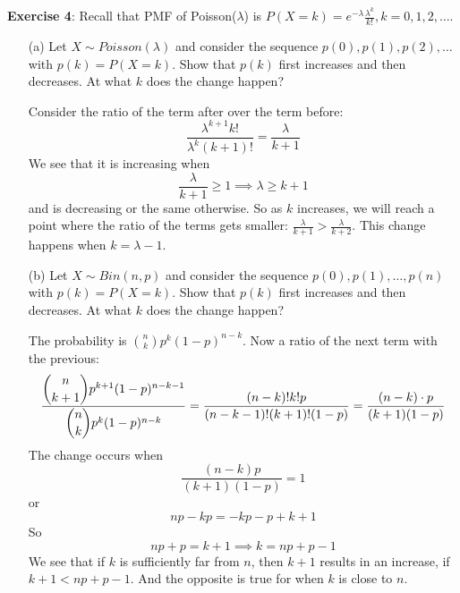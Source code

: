 \documentclass{article}
\begin{document}
\textbf{Exercise 4}: Recall that PMF of Poisson($\lambda$) is $P(X = k) = e^{-\lambda} \frac{\lambda^{k}}{k!}, k = 0, 1, 2, \ldots$.
    \begin{itemize}
        \item [(a)] Let $X \sim Poisson(\lambda)$ and consider the sequence $p(0), p(1), p(2), \ldots$ with $p(k) = P(X = k)$. Show that $p(k)$ first increases and then decreases. At what $k$ does the change happen?
            \begin{answer}
                Consider the ratio of the term after over the term before:
                    \begin{equation*}
                        \dfrac{\lambda^{k + 1}k!}{\lambda^{k}(k + 1)!} = \dfrac{\lambda}{k + 1}
                    \end{equation*}
                We see that it is increasing when 
                    \begin{equation*}
                        \dfrac{\lambda}{k + 1} \geq 1 \implies \lambda \geq k + 1
                    \end{equation*}
                and is decreasing or the same otherwise. So as $k$ increases, we will reach a point where the ratio of the terms gets smaller: $\frac{\lambda}{k + 1} > \frac{\lambda}{k + 2}$. This change happens when $k = \lambda - 1$.
            \end{answer}

        \item [(b)] Let $X \sim Bin(n, p)$ and consider the sequence $p(0), p(1), \ldots, p(n)$ with $p(k) = P(X = k)$. Show that $p(k)$ first increases and then decreases. At what $k$ does the change happen?
            \begin{answer}
                The probability is $\binom{n}{k}p^{k}(1 - p)^{n - k}$. Now a ratio of the next term with the previous:
                    \begin{equation*}
                        \dfrac{\dbinom{n}{k + 1} p^{k + 1}(1 - p)^{n - k - 1}}{\dbinom{n}{k}p^{k}(1 - p)^{n - k}} = \dfrac{(n - k)!k!p}{(n - k - 1)!(k + 1)!(1 - p)} = \dfrac{(n - k) \cdot p}{(k + 1)(1 - p)}
                    \end{equation*}
                The change occurs when
                    \begin{equation*}
                        \dfrac{(n - k)p}{(k + 1)(1 - p)} = 1
                    \end{equation*}
                or
                    \begin{equation*}
                        np - kp = -kp -p + k + 1
                    \end{equation*}
                So
                    \begin{equation*}
                        np + p =  k + 1 \implies k = np + p - 1
                    \end{equation*}
                We see that if $k$ is sufficiently far from $n$, then $k + 1$ results in an increase, if $k + 1 < np + p - 1$. And the opposite is true for when $k$ is close to $n$.
            \end{answer}
    \end{itemize}
\end{document}
